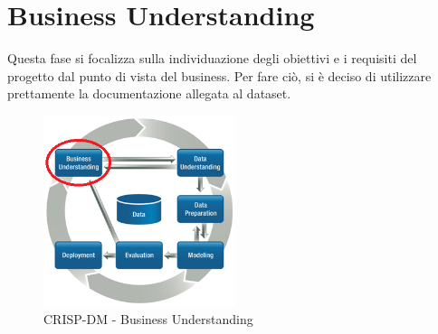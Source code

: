 \chapter{Business Understanding}
Questa fase si focalizza sulla individuazione degli obiettivi e i requisiti del progetto dal punto di vista del business. Per fare ciò, si è deciso di utilizzare prettamente la documentazione allegata al dataset.

\begin{figure}[hbtp]
	\centering
	\includegraphics[width=0.5\textwidth]{./images/CRISPDM_1.png}
	\caption{CRISP-DM - Business Understanding}
	\label{CRISPDM_1}
\end{figure}

